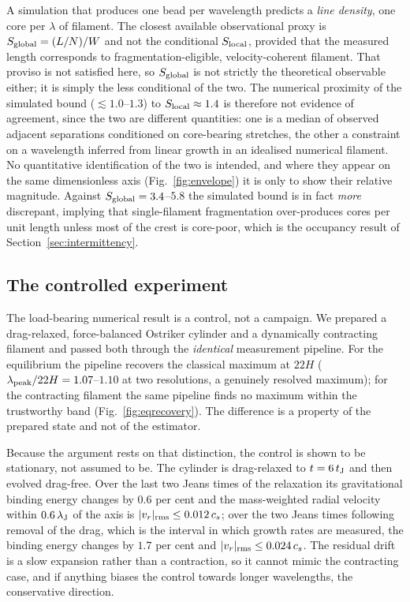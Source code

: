 \documentclass[usenatbib,twoside,twocolumn]{mnras}
\begin{document}
A simulation that produces one bead per wavelength predicts a \emph{line density}, one core per $\lambda$ of filament. The closest available observational proxy is $S_{\rm global}=(L/N)/W$ and not the conditional $S_{\rm local}$, provided that the measured length corresponds to fragmentation-eligible, velocity-coherent filament. That proviso is not satisfied here, so $S_{\rm global}$ is not strictly the theoretical observable either; it is simply the less conditional of the two. The numerical proximity of the simulated bound ($\lesssim1.0$--$1.3$) to $S_{\rm local}\approx1.4$ is therefore not evidence of agreement, since the two are different quantities: one is a median of observed adjacent separations conditioned on core-bearing stretches, the other a constraint on a wavelength inferred from linear growth in an idealised numerical filament. No quantitative identification of the two is intended, and where they appear on the same dimensionless axis (Fig.~\ref{fig:envelope}) it is only to show their relative magnitude. Against $S_{\rm global}=3.4$--$5.8$ the simulated bound is in fact \emph{more} discrepant, implying that single-filament fragmentation over-produces cores per unit length unless most of the crest is core-poor, which is the occupancy result of Section~\ref{sec:intermittency}.

\subsection{The controlled experiment}
\label{sec:control}

The load-bearing numerical result is a control, not a campaign. We prepared a drag-relaxed, force-balanced Ostriker cylinder and a dynamically contracting filament and passed both through the \emph{identical} measurement pipeline. For the equilibrium the pipeline recovers the classical maximum at $22H$ ($\lambda_{\rm peak}/22H=1.07$--$1.10$ at two resolutions, a genuinely resolved maximum); for the contracting filament the same pipeline finds no maximum within the trustworthy band (Fig.~\ref{fig:eqrecovery}). The difference is a property of the prepared state and not of the estimator.

Because the argument rests on that distinction, the control is shown to be stationary, not assumed to be. The cylinder is drag-relaxed to $t=6\,t_{\rm J}$ and then evolved drag-free. Over the last two Jeans times of the relaxation its gravitational binding energy changes by $0.6$ per cent and the mass-weighted radial velocity within $0.6\,\lambda_{\rm J}$ of the axis is $|v_r|_{\rm rms}\leq0.012\,c_s$; over the two Jeans times following removal of the drag, which is the interval in which growth rates are measured, the binding energy changes by $1.7$ per cent and $|v_r|_{\rm rms}\leq0.024\,c_s$. The residual drift is a slow expansion rather than a contraction, so it cannot mimic the contracting case, and if anything biases the control towards longer wavelengths, the conservative direction.
\end{document}
